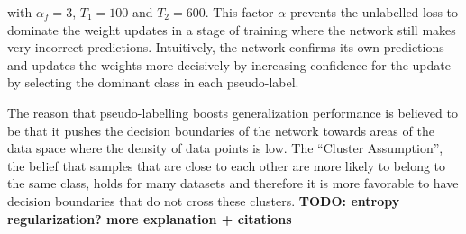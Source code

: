 \noindent with $\alpha_f = 3$, $T_1 = 100$ and $T_2 = 600$. This factor $\alpha$ prevents the unlabelled loss to dominate the weight updates in a stage of training where the network still makes very incorrect predictions. Intuitively, the network confirms its own predictions and updates the weights more decisively by increasing confidence for the update by selecting the dominant class in each pseudo-label.

The reason that pseudo-labelling boosts generalization performance is believed to be that it pushes the decision boundaries of the network towards areas of the data space where the density of data points is low. The ``Cluster Assumption'', the belief that samples that are close to each other are more likely to belong to the same class, holds for many datasets and therefore it is more favorable to have decision boundaries that do not cross these clusters. \textbf{TODO: entropy regularization? more explanation + citations}